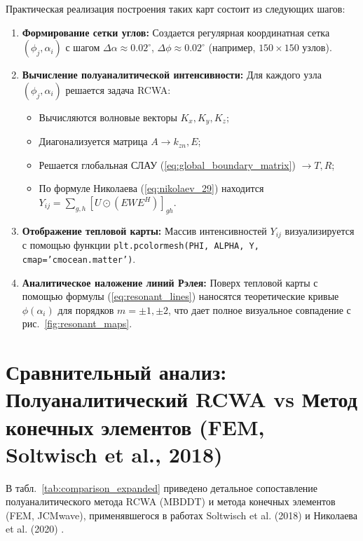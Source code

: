 \documentclass[a4paper,11pt]{article}
\begin{document}
Практическая реализация построения таких карт состоит из следующих шагов:
\begin{enumerate}
    \item \textbf{Формирование сетки углов:} Создается регулярная координатная сетка $(\phi_j, \alpha_i)$ с шагом $\Delta\alpha \approx 0.02^\circ$, $\Delta\phi \approx 0.02^\circ$ (например, $150 \times 150$ узлов).
    \item \textbf{Вычисление полуаналитической интенсивности:} Для каждого узла $(\phi_j, \alpha_i)$ решается задача RCWA:
    \begin{itemize}
        \item Вычисляются волновые векторы $K_x, K_y, K_z$;
        \item Диагонализуется матрица $A \to k_{zn}, E$;
        \item Решается глобальная СЛАУ (\ref{eq:global_boundary_matrix}) $\to T, R$;
        \item По формуле Николаева (\ref{eq:nikolaev_29}) находится $Y_{ij} = \sum_{g, h} [U \odot (E W E^H)]_{gh}$.
    \end{itemize}
    \item \textbf{Отображение тепловой карты:} Массив интенсивностей $Y_{ij}$ визуализируется с помощью функции \texttt{plt.pcolormesh(PHI, ALPHA, Y, cmap='cmocean.matter')}.
    \item \textbf{Аналитическое наложение линий Рэлея:} Поверх тепловой карты с помощью формулы (\ref{eq:resonant_lines}) наносятся теоретические кривые $\phi(\alpha_i)$ для порядков $m = \pm 1, \pm 2$, что дает полное визуальное совпадение с рис.~\ref{fig:resonant_maps}.
\end{enumerate}

\newpage
\section{Сравнительный анализ: Полуаналитический RCWA vs Метод конечных элементов (FEM, Soltwisch et al., 2018)}

В табл.~\ref{tab:comparison_expanded} приведено детальное сопоставление полуаналитического метода RCWA (MBDDT) и метода конечных элементов (FEM, JCMwave), применявшегося в работах Soltwisch et al. (2018) \cite{soltwisch2018} и Николаева et al. (2020) \cite{nikolaev2020}.
\end{document}
